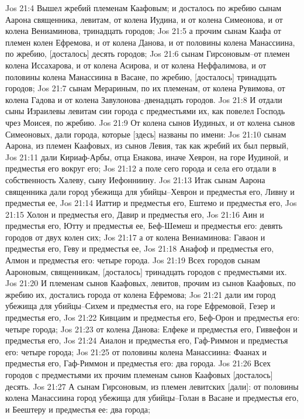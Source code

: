 Jos 21:4  Вышел жребий племенам Каафовым; и досталось по жребию сынам Аарона священника, левитам, от колена Иудина, и от колена Симеонова, и от колена Вениаминова, тринадцать городов;
Jos 21:5  а прочим сынам Каафа от племен колен Ефремова, и от колена Данова, и от половины колена Манассиина, по жребию, [досталось] десять городов;
Jos 21:6  сынам Гирсоновым--от племен колена Иссахарова, и от колена Асирова, и от колена Неффалимова, и от половины колена Манассиина в Васане, по жребию, [досталось] тринадцать городов;
Jos 21:7  сынам Мерариным, по их племенам, от колена Рувимова, от колена Гадова и от колена Завулонова--двенадцать городов.
Jos 21:8  И отдали сыны Израилевы левитам сии города с предместьями их, как повелел Господь чрез Моисея, по жребию.
Jos 21:9  От колена сынов Иудиных, и от колена сынов Симеоновых, дали города, которые [здесь] названы по имени:
Jos 21:10  сынам Аарона, из племен Каафовых, из сынов Левия, так как жребий их был первый,
Jos 21:11  дали Кириаф-Арбы, отца Енакова, иначе Хеврон, на горе Иудиной, и предместья его вокруг его;
Jos 21:12  а поле сего города и села его отдали в собственность Халеву, сыну Иефонниину.
Jos 21:13  Итак сынам Аарона священника дали город убежища для убийцы--Хеврон и предместья его, Ливну и предместья ее,
Jos 21:14  Иаттир и предместья его, Ештемо и предместья его,
Jos 21:15  Холон и предместья его, Давир и предместья его,
Jos 21:16  Аин и предместья его, Ютту и предместья ее, Беф-Шемеш и предместья его: девять городов от двух колен сих;
Jos 21:17  а от колена Вениаминова: Гаваон и предместья его, Геву и предместья ее,
Jos 21:18  Анафоф и предместья его, Алмон и предместья его: четыре города.
Jos 21:19  Всех городов сынам Аароновым, священникам, [досталось] тринадцать городов с предместьями их.
Jos 21:20  И племенам сынов Каафовых, левитов, прочим из сынов Каафовых, по жребию их, достались города от колена Ефремова;
Jos 21:21  дали им город убежища для убийцы--Сихем и предместья его, на горе Ефремовой, Гезер и предместья его,
Jos 21:22  Кивцаим и предместья его, Беф-Орон и предместья его: четыре города;
Jos 21:23  от колена Данова: Елфеке и предместья его, Гиввефон и предместья его,
Jos 21:24  Аиалон и предместья его, Гаф-Риммон и предместья его: четыре города;
Jos 21:25  от половины колена Манассиина: Фаанах и предместья его, Гаф-Риммон и предместья его: два города.
Jos 21:26  Всех городов с предместьями их прочим племенам сынов Каафовых [досталось] десять.
Jos 21:27  А сынам Гирсоновым, из племен левитских [дали]: от половины колена Манассиина город убежища для убийцы--Голан в Васане и предместья его, и Беештеру и предместья ее: два города;
